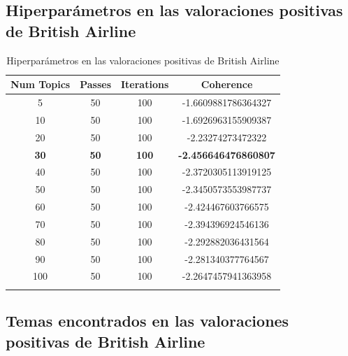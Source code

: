 \documentclass{report}
\begin{document}
            \subsection{Hiperparámetros en las valoraciones positivas de British Airline}
                \label{tab:hiperparametros_british_airline_positivas}
                \begin{longtable}{|c|c|c|c|}
                    \hline
                    \textbf{Num Topics} & \textbf{Passes} & \textbf{Iterations} & \textbf{Coherence} \\
                    \hline
                    5 & 50 & 100 & -1.6609881786364327 \\
                    \hline
                    10 & 50 & 100 & -1.6926963155909387 \\
                    \hline
                    20 & 50 & 100 & -2.23274273472322 \\
                    \hline
                    \textbf{30} & \textbf{50} & \textbf{100} & \textbf{-2.456646476860807} \\
                    \hline
                    40 & 50 & 100 & -2.3720305113919125 \\
                    \hline
                    50 & 50 & 100 & -2.3450573553987737 \\
                    \hline
                    60 & 50 & 100 & -2.424467603766575 \\
                    \hline
                    70 & 50 & 100 & -2.394396924546136 \\
                    \hline
                    80 & 50 & 100 & -2.292882036431564 \\
                    \hline
                    90 & 50 & 100 & -2.281340377764567 \\
                    \hline
                    100 & 50 & 100 & -2.2647457941363958 \\
                    \hline
                    \caption{Hiperparámetros en las valoraciones positivas de British Airline}
                \end{longtable}
            \clearpage\subsection{Temas encontrados en las valoraciones positivas de British Airline}
                \label{tab:temas_british_airline_positivas}
\end{document}
